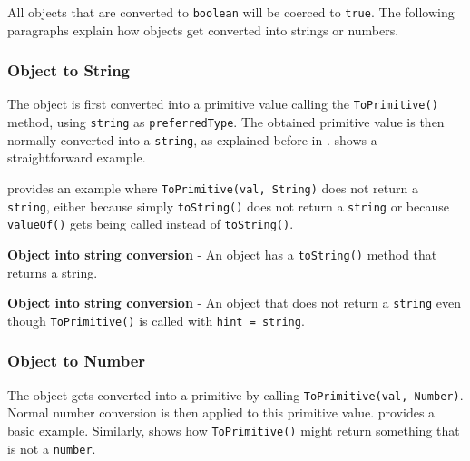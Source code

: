 All objects that are converted to \texttt{boolean} will be coerced to \texttt{true}. The following paragraphs explain how objects get converted into strings or numbers.

\subsubsection{Object to String}
The object is first converted into a primitive value calling the \texttt{ToPrimitive()} method, using \texttt{string} as \texttt{preferredType}. The obtained primitive value is then normally converted into a \texttt{string}, as explained before in .  shows a straightforward example.

 provides an example where \texttt{ToPrimitive(val, String)} does not return a \texttt{string}, either because simply \texttt{toString()} does not return a \texttt{string} or because \texttt{valueOf()} gets being called instead of \texttt{toString()}.

\begin{code}
	\captionsetup{aboveskip=0pt, belowskip=10pt}
	\caption[Object into string conversion]{\textbf{Object into string conversion} - An object has a \texttt{toString()} method that returns a string.}
	\label{code:background-object-into-string}
\end{code}

\begin{code}
	\captionsetup{aboveskip=0pt, belowskip=10pt}
	\caption[Object into string conversion]{\textbf{Object into string conversion} - An object that does not return a \texttt{string} even though \texttt{ToPrimitive()} is called with \texttt{hint = string}.}
	\label{code:background-object-into-string-not-string-return-value}
\end{code}

\subsubsection{Object to Number}
The object gets converted into a primitive by calling \texttt{ToPrimitive(val, Number)}. Normal number conversion is then applied to this primitive value.  provides a basic example. Similarly,  shows how \texttt{ToPrimitive()} might return something that is not a \texttt{number}.

